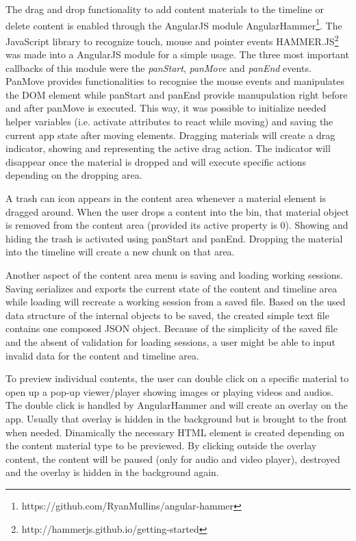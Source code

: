 \documentclass[conference]{IEEEtran}
\begin{document}
The drag and drop functionality to add content materials to the timeline or delete content is enabled through the AngularJS module AngularHammer\footnote{https://github.com/RyanMullins/angular-hammer}.
The JavaScript library to recognize touch, mouse and pointer events HAMMER.JS\footnote{http://hammerjs.github.io/getting-started} was made into a AngularJS module for a simple usage.
The three most important callbacks of this module were the \textit{panStart}, \textit{panMove} and \textit{panEnd} events.
PanMove provides functionalities to recognise the mouse events and manipulates the DOM element while panStart and panEnd provide manupulation right before and after panMove is executed.
This way, it was possible to initialize needed helper variables (i.e. activate attributes to react while moving) and saving the current app state after moving elements.
Dragging materials will create a drag indicator, showing and representing the active drag action.
The indicator will disappear once the material is dropped and will execute specific actions depending on the dropping area.

A trash can icon appears in the content area whenever a material element is dragged around.
When the user drops a content into the bin, that material object is removed from the content area (provided its active property is 0).
Showing and hiding the trash is activated using panStart and panEnd.
Dropping the material into the timeline will create a new chunk on that area.

Another aspect of the content area menu is saving and loading working sessions.
Saving serializes and exports the current state of the content and timeline area while loading will recreate a working session from a saved file.
Based on the used data structure of the internal objects to be saved, the created simple text file contains one composed JSON object.
Because of the simplicity of the saved file and the absent of validation for loading sessions, a user might be able to input invalid data for the content and timeline area.

To preview individual contents, the user can double click on a specific material to open up a pop-up viewer/player showing images or playing videos and audios.
The double click is handled by AngularHammer and will create an overlay on the app.
Usually that overlay is hidden in the background but is brought to the front when needed.
Dinamically the necessary HTML element is created depending on the content material type to be previewed.
By clicking outside the overlay content, the content will be paused (only for audio and video player), destroyed and the overlay is hidden in the background again.
\end{document}
